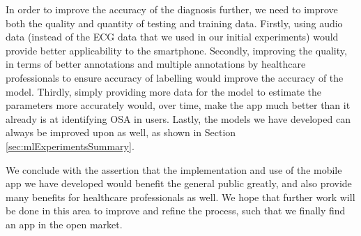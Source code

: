 In order to improve the accuracy of the diagnosis further, we need to improve both the quality and quantity of testing and training data. Firstly, using audio data (instead of the ECG data that we used in our initial experiments) would provide better applicability to the smartphone. Secondly, improving the quality, in terms of better annotations and multiple annotations by healthcare professionals to ensure accuracy of labelling would improve the accuracy of the model. Thirdly, simply providing more data for the model to estimate the parameters more accurately would, over time, make the app much better than it already is at identifying OSA in users. Lastly, the models we have developed can always be improved upon as well, as shown in Section \ref{sec:mlExperimentsSummary}.

We conclude with the assertion that the implementation and use of the mobile app we have developed would benefit the general public greatly, and also provide many benefits for healthcare professionals as well. We hope that further work will be done in this area to improve and refine the process, such that we finally find an app in the open market.